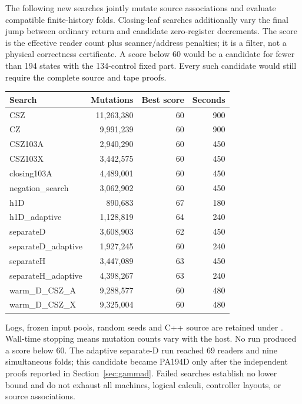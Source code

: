 The following new searches jointly mutate source associations and evaluate
compatible finite-history folds. Closing-leaf searches additionally vary the
final jump between ordinary return and candidate zero-register decrements.
The score is the effective reader count plus scanner/address penalties;
it is a filter, not a physical correctness certificate. A score below 60
would be a candidate for fewer than 194 states with the 134-control fixed part.
Every such candidate would still require the complete source and tape proofs.

\begin{center}\small
\begin{tabular}{@{}lrrr@{}}
\toprule
Search & Mutations & Best score & Seconds\\
\midrule
CSZ & 11,263,380 & 60 & 900\\
CZ & 9,991,239 & 60 & 900\\
CSZ103A & 2,940,290 & 60 & 450\\
CSZ103X & 3,442,575 & 60 & 450\\
closing103A & 4,489,001 & 60 & 450\\
negation\_search & 3,062,902 & 60 & 450\\
h1D & 890,683 & 67 & 180\\
h1D\_adaptive & 1,128,819 & 64 & 240\\
separateD & 3,608,903 & 62 & 450\\
separateD\_adaptive & 1,927,245 & 60 & 240\\
separateH & 3,447,089 & 63 & 450\\
separateH\_adaptive & 4,398,267 & 63 & 240\\
warm\_D\_CSZ\_A & 9,288,577 & 60 & 480\\
warm\_D\_CSZ\_X & 9,325,004 & 60 & 480\\
\bottomrule
\end{tabular}
\end{center}
Logs, frozen input pools, random seeds and C++ source are retained under
. Wall-time stopping means mutation counts vary with
the host. No run produced a score below 60. The adaptive separate-D run
reached 69 readers and nine simultaneous folds; this candidate became
PA194D only after the independent proofs reported in Section~\ref{sec:gammad}.
Failed searches establish no lower bound and do not exhaust all machines,
logical calculi, controller layouts, or source associations.
